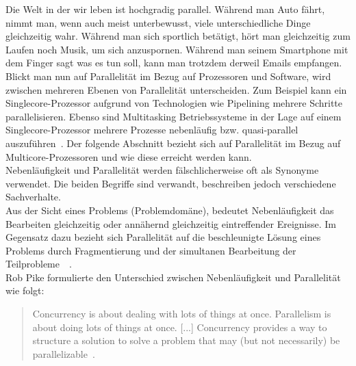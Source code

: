 Die Welt in der wir leben ist hochgradig parallel. Während man Auto fährt, nimmt man, wenn auch  meist unterbewusst, viele unterschiedliche Dinge gleichzeitig wahr. Während man sich sportlich betätigt, hört man gleichzeitig zum Laufen noch Musik, um sich anzuspornen. Während man seinem Smartphone mit dem Finger sagt was es tun soll, kann man trotzdem derweil Emails empfangen.\\
Blickt man nun auf Parallelität im Bezug auf Prozessoren und Software, wird zwischen mehreren Ebenen von Parallelität unterscheiden. Zum Beispiel kann ein Singlecore-Prozessor aufgrund von Technologien wie Pipelining mehrere Schritte parallelisieren. Ebenso sind Multitasking Betriebssysteme in der Lage auf einem Singlecore-Prozessor mehrere Prozesse nebenläufig bzw. quasi-parallel auszuführen~\cite[S.~3~\&~S.~4]{butcher_seven_2014}. Der folgende Abschnitt bezieht sich auf Parallelität im Bezug auf Multicore-Prozessoren und wie diese erreicht werden kann.\\
Nebenläufigkeit und Parallelität werden fälschlicherweise oft als Synonyme verwendet. Die beiden Begriffe sind verwandt, beschreiben jedoch verschiedene Sachverhalte.\\
Aus der Sicht eines Problems (Problemdomäne), bedeutet Nebenläufigkeit das Bearbeiten gleichzeitig oder annähernd gleichzeitig eintreffender Ereignisse. Im Gegensatz dazu bezieht sich Parallelität auf die beschleunigte Lösung eines Problems durch Fragmentierung und der simultanen Bearbeitung der Teilprobleme~\cite[S.~1~\&~S.~2]{butcher_seven_2014}~\cite[S.~15]{vernon_reactive_2016}.\\
Rob Pike formulierte den Unterschied zwischen Nebenläufigkeit und Parallelität wie folgt:

\begin{quotation}
  Concurrency is about dealing with lots of things at once. Parallelism is about doing lots of things at once. [...] Concurrency provides a way to structure a solution to solve a problem that may (but not necessarily) be parallelizable~.
\cite[S.~10]{pike_concurrency_2012}
\end{quotation}

